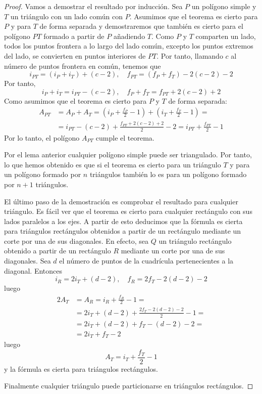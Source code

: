 \documentclass[a4paper,12pt]{article}
\begin{document}
\begin{proof}
    Vamos a demostrar el resultado por inducción. Sea $P$ un polígono simple y $T$ un triángulo con un lado común con $P$. Asumimos que el teorema es cierto para $P$ y para $T$ de forma separada y demostraremos que también es cierto para el polígono $PT$ formado a partir de $P$ añadiendo $T$. Como $P$ y $T$ comparten un lado, todos los puntos frontera a lo largo del lado común, excepto los puntos extremos del lado, se convierten en puntos interiores de $PT$. Por tanto, llamando $c$ al número de puntos frontera en común, tenemos que
    $$i_{PT}=(i_P + i_T) + ( c - 2 ), \quad f_{PT}=(f_P+f_T) - 2(c-2)-2$$
    Por tanto,
    $$i_P+i_T = i_{PT}-(c-2), \quad f_P+f_T=f_{PT}+2(c-2)+2$$
    Como asumimos que el teorema es cierto para $P$ y $T$ de forma separada:
    \begin{equation*}
        \begin{split}
            A_{PT} & = A_P + A_T = \left(i_P+\frac{f_P}{2}-1\right) + \left(i_T+\frac{f_T}{2}-1\right) = \\
                    & = i_{PT} - (c - 2) + \frac{f_{PT}+2(c-2)+2}{2}-2 = i_{PT}+\frac{f_{PT}}{2} - 1
        \end{split}
    \end{equation*}
    Por lo tanto, el polígono $A_{PT}$ cumple el  teorema.

    Por el lema anterior cualquier polígono simple puede ser triangulado. Por tanto, lo que hemos obtenido es que si el teorema es cierto para un triángulo $T$ y para un polígono formado por $n$ triángulos también lo es para un polígono formado por $n+1$ triángulos.

    El último paso de la demostración es comprobar el resultado para cualquier triángulo. Es fácil ver que el teorema es cierto para cualquier rectángulo con sus lados paralelos a los ejes. A partir de esto deducimos que la fórmula es cierta para triángulos rectángulos obtenidos a partir de un rectángulo mediante un corte por una de sus diagonales. En efecto, sea $Q$ un triángulo rectángulo obtenido a partir de un rectángulo $R$ mediante un corte por una de sus diagonales. Sea $d$ el número de puntos de la cuadrícula pertenecientes a la diagonal. Entonces
    $$i_R=2i_T+(d-2), \quad f_R=2f_T - 2(d-2) -2$$
    luego
    \begin{equation*}
        \begin{split}
            2A_T & = A_R = i_R+\frac{f_R}{2}-1 = \\
                 & = 2i_T+(d-2)+\frac{2f_T - 2(d-2) -2}{2}-1 = \\
                 & = 2i_T+(d-2)+f_T-(d-2)-2 = \\
                 & = 2i_T+f_T-2
        \end{split}
    \end{equation*}
    luego
    $$A_T=i_T+\frac{f_T}{2}-1$$
    y la fórmula es cierta para triángulos rectángulos.

    Finalmente cualquier triángulo puede particionarse en triángulos rectángulos.
\end{proof}
\end{document}
